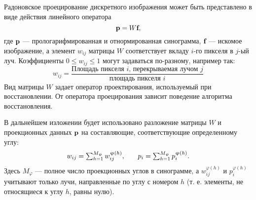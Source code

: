 Радоновское проецирование дискретного изображения может быть представлено в виде действия линейного оператора
\begin{equation}\label{eq:linear_system}
\textbf p = W \textbf f,
\end{equation}
где $\textbf p$ --- прологарифмированная и отнормированная синограмма, $\textbf f$ --- искомое изображение, а элемент $w_{ij}$ матрицы $W$ соответствует вкладу $i$-го пикселя в $j$-ый луч.
Коэффициенты $0 \leq w_{ij} \leq 1$ могут задаваться по-разному, например так:
\begin{equation}
\label{eq:coeff}
w_{ij} = \frac{\text{Площадь пикселя $i$, перекрываемая лучом $j$}}{\text{площадь пикселя $i$}}
\end{equation}
Вид матрицы $W$ задает оператор проектирования, используемый при восстановлении.
От оператора проецирования зависит поведение алгоритма восстановления.

В дальнейшем изложении будет использовано разложение матрицы $W$ и проекционных данных $\textbf p$ на составляющие, соответствующие определенному углу:
\begin{equation} \notag
\begin{array}{l l}
w_{ij} = \sum_{h = 1}^{M_\varphi} {w_{ij}^{\varphi(h)}}, & \quad
p_i = \sum_{h = 1}^{M_\varphi} {p_i^{\varphi(h)}}.
\end{array}
\end{equation}
Здесь $M_\varphi$ ---  полное число проекционных углов в синограмме, а  $w_{ij}^{\varphi(h)}$ и $p_i^{\varphi(h)}$ учитывают только лучи, направленные по углу с номером $h$ (т. е. элементы, не относящиеся к углу $h$, равны нулю).

